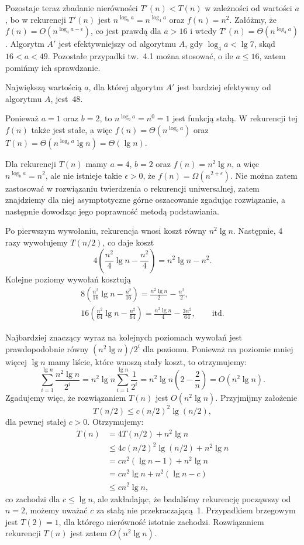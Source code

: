 Pozostaje teraz zbadanie nierówności $T'(n)<T(n)$ w zależności od wartości $a$, bo w rekurencji $T'(n)$ jest $n^{\log_ba}=n^{\log_4a}$ oraz $f(n)=n^2$. Załóżmy, że $f(n)=O(n^{\log_4a-\epsilon})$, co jest prawdą dla $a>16$ i wtedy $T'(n)=\Theta(n^{\log_4a})$. Algorytm $A'$ jest efektywniejszy od algorytmu $A$, gdy $\log_4a<\lg7$, skąd $16<a<49$. Pozostałe przypadki tw.~4.1 można stosować, o ile $a\le16$, zatem pomińmy ich sprawdzanie.

Największą wartością $a$, dla której algorytm $A'$ jest bardziej efektywny od algorytmu $A$, jest~$48$.

\exercise %
Ponieważ $a=1$ oraz $b=2$, to $n^{\log_ba}=n^0=1$ jest funkcją stałą. W rekurencji tej $f(n)$ także jest stałe, a więc $f(n)=\Theta(n^{\log_ba})$ oraz $T(n)=\Theta(n^{\log_ba}\lg n)=\Theta(\lg n)$.

\exercise %
Dla rekurencji $T(n)$ mamy $a=4$, $b=2$ oraz $f(n)=n^2\lg n$, a więc $n^{\log_ba}=n^2$, ale nie istnieje takie $\epsilon>0$, że $f(n)=\Omega(n^{2+\epsilon})$. Nie można zatem zastosować w rozwiązaniu twierdzenia o rekurencji uniwersalnej, zatem znajdziemy dla niej asymptotyczne górne oszacowanie zgadując rozwiązanie, a następnie dowodząc jego poprawność metodą podstawiania.

Po pierwszym wywołaniu, rekurencja wnosi koszt równy $n^2\lg n$. Następnie, 4 razy wywołujemy $T(n/2)$, co daje koszt
\[
	4\left(\frac{n^2}{4}\lg n-\frac{n^2}{4}\right) = n^2\lg n-n^2.
\]
Kolejne poziomy wywołań kosztują
\begin{gather*}
	8\left(\frac{n^2}{16}\lg n-\frac{n^2}{16}\right) = \frac{n^2\lg n}{2}-\frac{n^2}{2}, \qquad\phantom{itd.} \\
	16\left(\frac{n^2}{64}\lg n-\frac{n^2}{64}\right) = \frac{n^2\lg n}{4}-\frac{3n^2}{64}, \qquad\text{itd.}
\end{gather*}

Najbardziej znaczący wyraz na kolejnych poziomach wywołań jest prawdopodobnie równy $(n^2\lg n)/2^i$ dla  poziomu. Ponieważ na poziomie mniej więcej $\lg n$ mamy liście, które wnoszą stały koszt, to otrzymujemy:
\[
	\sum_{i=1}^{\lg n}\frac{n^2\lg n}{2^i} = n^2\lg n\sum_{i=1}^{\lg n}\frac{1}{2^i} = n^2\lg n\left(2-\frac{2}{n}\right) = O(n^2\lg n).
\]
Zgadujemy więc, że rozwiązaniem $T(n)$ jest $O(n^2\lg n)$. Przyjmijmy założenie
\[
	T(n/2) \le c(n/2)^2\lg(n/2),
\]
dla pewnej stałej $c>0$. Otrzymujemy:
\begin{align*}
	T(n) &= 4T(n/2)+n^2\lg n \\
	&\le 4c(n/2)^2\lg(n/2)+n^2\lg n \\
	&= cn^2(\lg n-1)+n^2\lg n \\
	&= cn^2\lg n+n^2(\lg n-c) \\
	&\le cn^2\lg n,
\end{align*}
co zachodzi dla $c\le\lg n$, ale zakładając, że badaliśmy rekurencję począwszy od $n=2$, możemy uważać $c$ za stałą nie przekraczającą~1. Przypadkiem brzegowym jest $T(2)=1$, dla którego nierówność istotnie zachodzi. Rozwiązaniem rekurencji $T(n)$ jest zatem $O(n^2\lg n)$.

